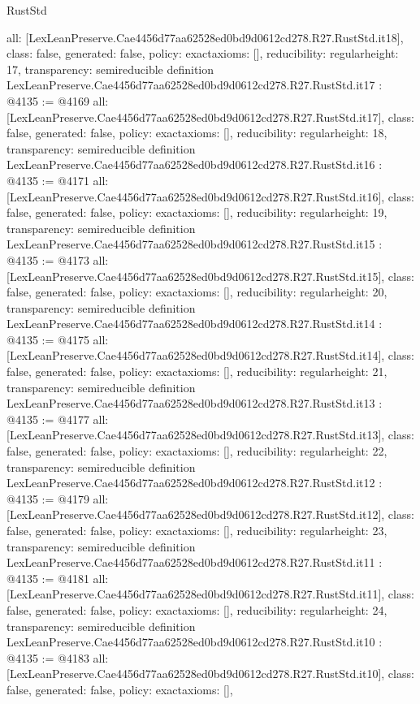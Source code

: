 \begin{lexlean}{RustStd}
\begin{coremodule}
{  all: [LexLeanPreserve.Cae4456d77aa62528ed0bd9d0612cd278.R27.RustStd.it18],
  class: false,
  generated: false,
  policy: exact{axioms: []},
  reducibility: regular{height: 17},
  transparency: semireducible
}
definition LexLeanPreserve.Cae4456d77aa62528ed0bd9d0612cd278.R27.RustStd.it17 : @4135 := @4169 {
  all: [LexLeanPreserve.Cae4456d77aa62528ed0bd9d0612cd278.R27.RustStd.it17],
  class: false,
  generated: false,
  policy: exact{axioms: []},
  reducibility: regular{height: 18},
  transparency: semireducible
}
definition LexLeanPreserve.Cae4456d77aa62528ed0bd9d0612cd278.R27.RustStd.it16 : @4135 := @4171 {
  all: [LexLeanPreserve.Cae4456d77aa62528ed0bd9d0612cd278.R27.RustStd.it16],
  class: false,
  generated: false,
  policy: exact{axioms: []},
  reducibility: regular{height: 19},
  transparency: semireducible
}
definition LexLeanPreserve.Cae4456d77aa62528ed0bd9d0612cd278.R27.RustStd.it15 : @4135 := @4173 {
  all: [LexLeanPreserve.Cae4456d77aa62528ed0bd9d0612cd278.R27.RustStd.it15],
  class: false,
  generated: false,
  policy: exact{axioms: []},
  reducibility: regular{height: 20},
  transparency: semireducible
}
definition LexLeanPreserve.Cae4456d77aa62528ed0bd9d0612cd278.R27.RustStd.it14 : @4135 := @4175 {
  all: [LexLeanPreserve.Cae4456d77aa62528ed0bd9d0612cd278.R27.RustStd.it14],
  class: false,
  generated: false,
  policy: exact{axioms: []},
  reducibility: regular{height: 21},
  transparency: semireducible
}
definition LexLeanPreserve.Cae4456d77aa62528ed0bd9d0612cd278.R27.RustStd.it13 : @4135 := @4177 {
  all: [LexLeanPreserve.Cae4456d77aa62528ed0bd9d0612cd278.R27.RustStd.it13],
  class: false,
  generated: false,
  policy: exact{axioms: []},
  reducibility: regular{height: 22},
  transparency: semireducible
}
definition LexLeanPreserve.Cae4456d77aa62528ed0bd9d0612cd278.R27.RustStd.it12 : @4135 := @4179 {
  all: [LexLeanPreserve.Cae4456d77aa62528ed0bd9d0612cd278.R27.RustStd.it12],
  class: false,
  generated: false,
  policy: exact{axioms: []},
  reducibility: regular{height: 23},
  transparency: semireducible
}
definition LexLeanPreserve.Cae4456d77aa62528ed0bd9d0612cd278.R27.RustStd.it11 : @4135 := @4181 {
  all: [LexLeanPreserve.Cae4456d77aa62528ed0bd9d0612cd278.R27.RustStd.it11],
  class: false,
  generated: false,
  policy: exact{axioms: []},
  reducibility: regular{height: 24},
  transparency: semireducible
}
definition LexLeanPreserve.Cae4456d77aa62528ed0bd9d0612cd278.R27.RustStd.it10 : @4135 := @4183 {
  all: [LexLeanPreserve.Cae4456d77aa62528ed0bd9d0612cd278.R27.RustStd.it10],
  class: false,
  generated: false,
  policy: exact{axioms: []},
}
\end{coremodule}
\end{lexlean}
